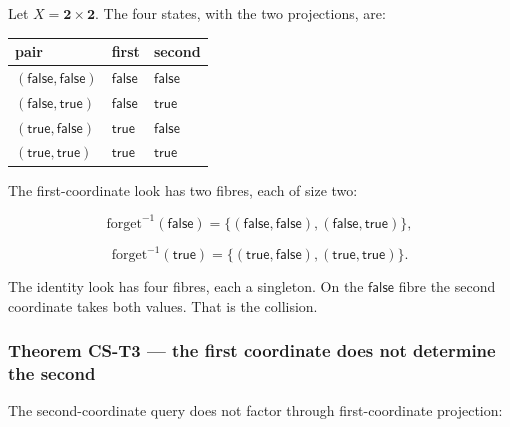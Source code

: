 \documentclass[
  11pt,
]{article}
\begin{document}
Let \(X=\mathbf{2}\times\mathbf{2}\). The four states, with the two projections, are:

\begin{longtable}[]{@{}
  >{\raggedright\arraybackslash}p{}
  >{\raggedright\arraybackslash}p{}
  >{\raggedright\arraybackslash}p{}@{}}
\toprule\noalign{}
\begin{minipage}[b]{\linewidth}\raggedright
pair
\end{minipage} & \begin{minipage}[b]{\linewidth}\raggedright
first
\end{minipage} & \begin{minipage}[b]{\linewidth}\raggedright
second
\end{minipage} \\
\midrule\noalign{}
\endhead
\bottomrule\noalign{}
\endlastfoot
\((\mathsf{false},\mathsf{false})\) & \(\mathsf{false}\) & \(\mathsf{false}\) \\
\((\mathsf{false},\mathsf{true})\) & \(\mathsf{false}\) & \(\mathsf{true}\) \\
\((\mathsf{true},\mathsf{false})\) & \(\mathsf{true}\) & \(\mathsf{false}\) \\
\((\mathsf{true},\mathsf{true})\) & \(\mathsf{true}\) & \(\mathsf{true}\) \\
\end{longtable}

The first-coordinate look has two fibres, each of size two:

\[
\mathrm{forget}^{-1}(\mathsf{false})
=
\{(\mathsf{false},\mathsf{false}),(\mathsf{false},\mathsf{true})\},
\]

\[
\mathrm{forget}^{-1}(\mathsf{true})
=
\{(\mathsf{true},\mathsf{false}),(\mathsf{true},\mathsf{true})\}.
\]

The identity look has four fibres, each a singleton. On the \(\mathsf{false}\) fibre the second coordinate takes both values. That is the collision.

\subsubsection{Theorem CS-T3 --- the first coordinate does not determine the second}\label{theorem-cs-t3-the-first-coordinate-does-not-determine-the-second}

The second-coordinate query does not factor through first-coordinate projection:
\end{document}
